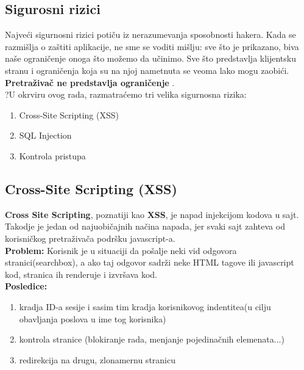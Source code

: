 \documentclass[a4paper]{article}
\begin{document}
\subsection{Sigurosni rizici}
Najve\'{c}i sigurnosni rizici poti\v{c}u iz nerazumevanja sposobnosti hakera. Kada se razmi\v{s}lja o za\v{s}titi aplikacije, ne sme se voditi mi\v{s}lju: sve \v{s}to je prikazano, biva na\v{s}e ograni\v{c}enje onoga \v{s}to mo\v{z}emo da u\v{c}inimo. Sve \v{s}to predstavlja klijentsku stranu i ograni\v{c}enja koja su na njoj nametnuta se veoma lako mogu zaobi\'{c}i.
\textbf{Pretra\v{z}iva\v{c} ne predstavlja ograni\v{c}enje }.\\
?U okrviru ovog rada, razmatra\'{c}emo tri velika sigurnosna rizika:
\begin{enumerate}
	\item Cross-Site Scripting (XSS)
	\item SQL Injection
	\item Kontrola pristupa
\end{enumerate}
\newpage
\subsection{Cross-Site Scripting (XSS)}
\textbf{Cross Site Scripting}, poznatiji kao \textbf{XSS}, je napad injekcijom kodova u sajt. Takodje je jedan od najuobi\v{c}ajnih na\v{c}ina napada, jer svaki sajt zahteva od korisni\v{c}kog pretra\v{z}iva\v{c}a podr\v{s}ku javascript-a.\\
\textbf{Problem:} Korisnik je u situaciji da po\v{s}alje neki vid odgovora stranici(searchbox), a ako taj odgovor sadr\v{z}i neke HTML tagove ili javascript kod, stranica ih renderuje i izvr\v{s}ava kod.\\
\textbf{Posledice:} \begin{enumerate}
	\item kradja ID-a sesije i sasim tim kradja korisnikovog indentitea(u cilju obavljanja poslova u ime tog korisnika)
	\item kontrola stranice (blokiranje rada, menjanje pojedina\v{c}nih elemenata...)
	\item redirekcija na drugu, zlonamernu stranicu
\end{enumerate}
\end{document}
